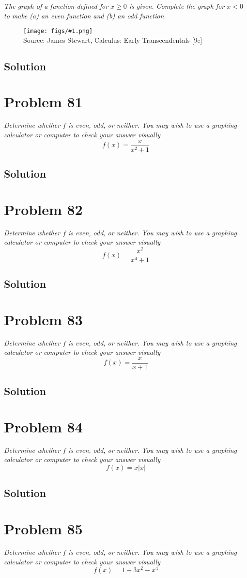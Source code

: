 \documentclass[11pt]{article}
\newcommand{\soln}{\subsection*}
\newcommand{\qn}{\textit}
\newcommand{\imagesource}[1]{{\footnotesize Source: #1}}
\newcommand{\imgqn}[1]{
	\begin{figure}[h]
		\centering
		\texttt{[image: figs/\#1.png]}\\
		\imagesource{James Stewart, Calculus: Early Transcendentals [9e]}
	\end{figure}
}
\begin{document}
\qn{The graph of a function defined for $x \ge 0$ is given. Complete the graph for $x<0$ to make (a) an even function and (b) an odd function.}

\imgqn{1.1.80}

\soln{Solution}

\section*{Problem 81}

\qn{Determine whether $f$ is even, odd, or neither. You may wish to use a graphing calculator or computer to check your answer visually $$f(x)=\frac{x}{x^2+1}$$}

\soln{Solution}

\section*{Problem 82}

\qn{Determine whether $f$ is even, odd, or neither. You may wish to use a graphing calculator or computer to check your answer visually $$f(x)=\frac{x^2}{x^4+1}$$}

\soln{Solution}

\section*{Problem 83}

\qn{Determine whether $f$ is even, odd, or neither. You may wish to use a graphing calculator or computer to check your answer visually $$f(x)=\frac{x}{x+1}$$}

\soln{Solution}

\section*{Problem 84}

\qn{Determine whether $f$ is even, odd, or neither. You may wish to use a graphing calculator or computer to check your answer visually $$f(x)=x|x|$$}

\soln{Solution}

\section*{Problem 85}

\qn{Determine whether $f$ is even, odd, or neither. You may wish to use a graphing calculator or computer to check your answer visually $$f(x)=1+3x^2-x^4$$}
\end{document}
